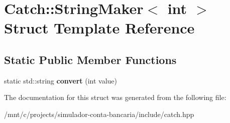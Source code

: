 \hypertarget{structCatch_1_1StringMaker_3_01int_01_4}{}\section{Catch\+:\+:String\+Maker$<$ int $>$ Struct Template Reference}
\label{structCatch_1_1StringMaker_3_01int_01_4}
\subsection*{Static Public Member Functions}
\begin{DoxyCompactItemize}
\item 
\mbox{\label{structCatch_1_1StringMaker_3_01int_01_4_aab096e55fb7283f6ad47b5ca277e22e8}} 
static std\+::string {\bfseries convert} (int value)
\end{DoxyCompactItemize}


The documentation for this struct was generated from the following file\+:\begin{DoxyCompactItemize}
\item 
/mnt/c/projects/simulador-\/conta-\/bancaria/include/catch.\+hpp\end{DoxyCompactItemize}
